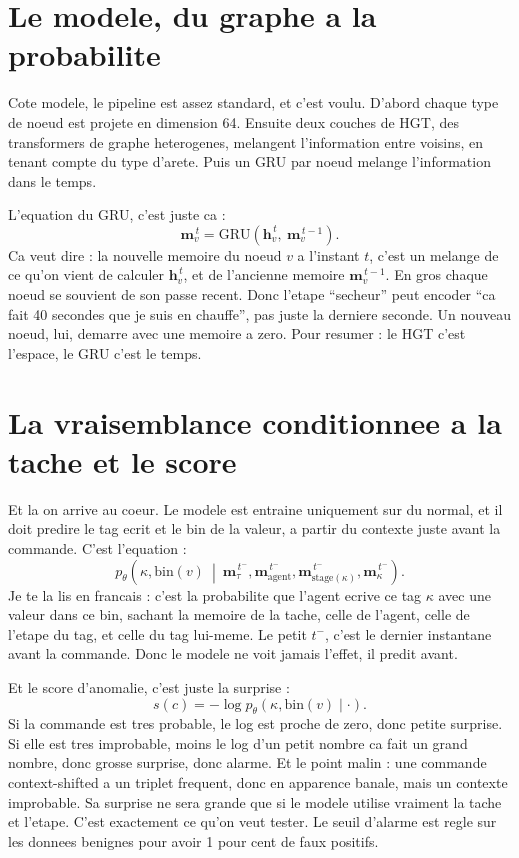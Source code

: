 \documentclass[11pt]{article}
\begin{document}
\section{Le modele, du graphe a la probabilite}
Cote modele, le pipeline est assez standard, et c'est voulu. D'abord chaque type de
noeud est projete en dimension 64. Ensuite deux couches de HGT, des transformers de
graphe heterogenes, melangent l'information entre voisins, en tenant compte du type
d'arete. Puis un GRU par noeud melange l'information dans le temps.

L'equation du GRU, c'est juste ca :
\[
  \mathbf{m}_v^{\,t} = \mathrm{GRU}\!\left(\mathbf{h}_v^{\,t},\ \mathbf{m}_v^{\,t-1}\right).
\]
Ca veut dire : la nouvelle memoire du noeud \(v\) a l'instant \(t\), c'est un
melange de ce qu'on vient de calculer \(\mathbf{h}_v^{\,t}\), et de l'ancienne
memoire \(\mathbf{m}_v^{\,t-1}\). En gros chaque noeud se souvient de son passe
recent. Donc l'etape ``secheur'' peut encoder ``ca fait 40 secondes que je suis en
chauffe'', pas juste la derniere seconde. Un nouveau noeud, lui, demarre avec une
memoire a zero. Pour resumer : le HGT c'est l'espace, le GRU c'est le temps.

\section{La vraisemblance conditionnee a la tache et le score}
Et la on arrive au coeur. Le modele est entraine uniquement sur du normal, et il
doit predire le tag ecrit et le bin de la valeur, a partir du contexte juste avant
la commande. C'est l'equation :
\[
  p_\theta\!\left(\kappa, \mathrm{bin}(v)\ \middle|\
  \mathbf{m}_{\tau}^{\,t^-}, \mathbf{m}_{\text{agent}}^{\,t^-},
  \mathbf{m}_{\text{stage}(\kappa)}^{\,t^-}, \mathbf{m}_{\kappa}^{\,t^-}\right).
\]
Je te la lis en francais : c'est la probabilite que l'agent ecrive ce tag
\(\kappa\) avec une valeur dans ce bin, sachant la memoire de la tache, celle de
l'agent, celle de l'etape du tag, et celle du tag lui-meme. Le petit \(t^-\), c'est
le dernier instantane avant la commande. Donc le modele ne voit jamais l'effet, il
predit avant.

Et le score d'anomalie, c'est juste la surprise :
\[
  s(c) = -\log p_\theta\!\left(\kappa, \mathrm{bin}(v)\mid\cdot\right).
\]
Si la commande est tres probable, le log est proche de zero, donc petite surprise.
Si elle est tres improbable, moins le log d'un petit nombre ca fait un grand nombre,
donc grosse surprise, donc alarme. Et le point malin : une commande context-shifted
a un triplet frequent, donc en apparence banale, mais un contexte improbable. Sa
surprise ne sera grande que si le modele utilise vraiment la tache et l'etape.
C'est exactement ce qu'on veut tester. Le seuil d'alarme est regle sur les donnees
benignes pour avoir 1 pour cent de faux positifs.
\end{document}
